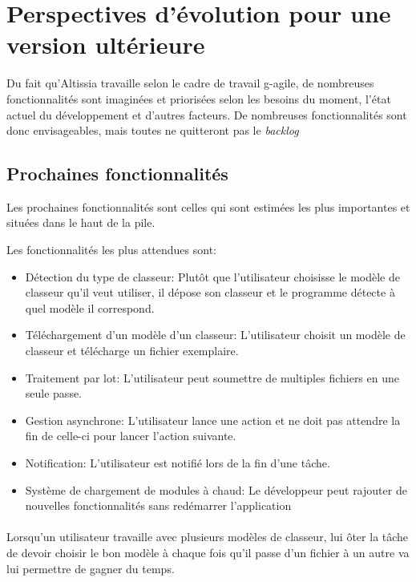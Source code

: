 \section{Perspectives d'évolution pour une version ultérieure}
\label{sec:future-release-outlook}

Du fait qu’Altissia travaille selon le cadre de travail \Gls{g-agile}, de nombreuses fonctionnalités sont imaginées et priorisées selon les besoins du moment, l'état actuel du développement et d'autres facteurs.
De nombreuses fonctionnalités sont donc envisageables, mais toutes ne quitteront pas le \textit{backlog}\fnmark
{}

\subsection{Prochaines fonctionnalités}
\label{subsec:next-features}

Les prochaines fonctionnalités sont celles qui sont estimées les plus importantes et situées dans le haut de la pile.

Les fonctionnalités les plus attendues sont:
\begin{itemize}
    \item Détection du type de classeur: Plutôt que l'utilisateur choisisse le modèle de classeur qu'il veut utiliser, il dépose son classeur et le programme détecte à quel modèle il correspond.
    \item Téléchargement d'un modèle d'un classeur: L'utilisateur choisit un modèle de classeur et télécharge un fichier exemplaire.
    \item Traitement par lot: L'utilisateur peut soumettre de multiples fichiers en une seule passe.
    \item Gestion asynchrone: L'utilisateur lance une action et ne doit pas attendre la fin de celle-ci pour lancer l'action suivante.
    \item Notification: L'utilisateur est notifié lors de la fin d'une tâche.
    \item Système de chargement de modules à chaud: Le développeur peut rajouter de nouvelles fonctionnalités sans redémarrer l'application
\end{itemize}

\paragraph{}
Lorsqu'un utilisateur travaille avec plusieurs modèles de classeur, lui ôter la tâche de devoir choisir le bon modèle à chaque fois qu'il passe d'un fichier à un autre va lui permettre de gagner du temps.


